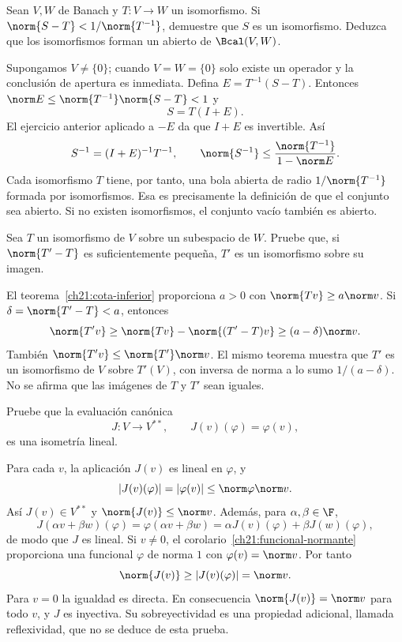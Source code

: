 \begin{ejercicio}
Sean $V,W$ de Banach y $T:V\to W$ un isomorfismo. Si $\norm{S-T}<1/\norm{T^{-1}}$, demuestre que $S$ es un isomorfismo. Deduzca que los isomorfismos forman un abierto de $\Bcal(V,W)$.
\end{ejercicio}
\begin{solucion}
Supongamos $V\ne\{0\}$; cuando $V=W=\{0\}$ solo existe un operador y la conclusión de apertura es inmediata. Defina $E=T^{-1}(S-T)$. Entonces $\norm E\leq\norm{T^{-1}}\norm{S-T}<1$ y
\[
 S=T(I+E).
\]
El ejercicio anterior aplicado a $-E$ da que $I+E$ es invertible. Así
\[
 S^{-1}=(I+E)^{-1}T^{-1},\qquad
 \norm{S^{-1}}\leq\frac{\norm{T^{-1}}}{1-\norm E}.
\]
Cada isomorfismo $T$ tiene, por tanto, una bola abierta de radio $1/\norm{T^{-1}}$ formada por isomorfismos. Esa es precisamente la definición de que el conjunto sea abierto. Si no existen isomorfismos, el conjunto vacío también es abierto.
\end{solucion}

\begin{ejercicio}
Sea $T$ un isomorfismo de $V$ sobre un subespacio de $W$. Pruebe que, si $\norm{T'-T}$ es suficientemente pequeña, $T'$ es un isomorfismo sobre su imagen.
\end{ejercicio}
\begin{solucion}
El teorema~\ref{ch21:cota-inferior} proporciona $a>0$ con $\norm{Tv}\geq a\norm v$. Si $\delta=\norm{T'-T}<a$, entonces
\[
 \norm{T'v}\geq\norm{Tv}-\norm{(T'-T)v}\geq(a-\delta)\norm v.
\]
También $\norm{T'v}\leq\norm{T'}\norm v$. El mismo teorema muestra que $T'$ es un isomorfismo de $V$ sobre $T'(V)$, con inversa de norma a lo sumo $1/(a-\delta)$. No se afirma que las imágenes de $T$ y $T'$ sean iguales.
\end{solucion}

\begin{ejercicio}
Pruebe que la evaluación canónica
\[
 J:V\longrightarrow V^{**},\qquad J(v)(\varphi)=\varphi(v),
\]
es una isometría lineal.
\end{ejercicio}
\begin{solucion}
Para cada $v$, la aplicación $J(v)$ es lineal en $\varphi$, y
\[
 |J(v)(\varphi)|=|\varphi(v)|\leq\norm\varphi\norm v.
\]
Así $J(v)\in V^{**}$ y $\norm{J(v)}\leq\norm v$. Además, para $\alpha,\beta\in\F$,
\[
 J(\alpha v+\beta w)(\varphi)
 =\varphi(\alpha v+\beta w)
 =\alpha J(v)(\varphi)+\beta J(w)(\varphi),
\]
de modo que $J$ es lineal. Si $v\ne0$, el corolario~\ref{ch21:funcional-normante} proporciona una funcional $\varphi$ de norma $1$ con $\varphi(v)=\norm v$. Por tanto
\[
 \norm{J(v)}\geq|J(v)(\varphi)|=\norm v.
\]
Para $v=0$ la igualdad es directa. En consecuencia $\norm{J(v)}=\norm v$ para todo $v$, y $J$ es inyectiva. Su sobreyectividad es una propiedad adicional, llamada reflexividad, que no se deduce de esta prueba.
\end{solucion}

